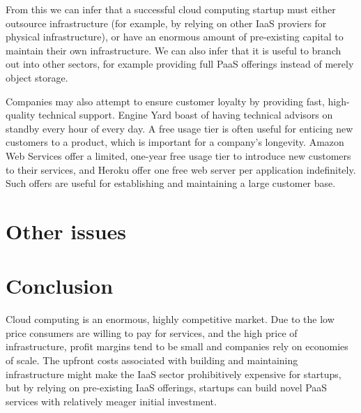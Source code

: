 \documentclass[a4paper]{proc}
\begin{document}
  From this we can infer that a successful cloud computing startup must either outsource infrastructure (for example, by relying on other IaaS proviers for physical infrastructure), or have an enormous amount of pre-existing capital to maintain their own infrastructure. We can also infer that it is useful to branch out into other sectors, for example providing full PaaS offerings instead of merely object storage.

  Companies may also attempt to ensure customer loyalty by providing fast, high-quality technical support. Engine Yard boast of having technical advisors on standby every hour of every day. A free usage tier is often useful for enticing new customers to a product, which is important for a company's longevity. Amazon Web Services offer a limited, one-year free usage tier to introduce new customers to their services, and Heroku offer one free web server per application indefinitely. Such offers are useful for establishing and maintaining a large customer base.

  \section{Other issues}
  \label{sec:other}


  \section{Conclusion}
  \label{sec:conclusion}

  Cloud computing is an enormous, highly competitive market. Due to the low price consumers are willing to pay for services, and the high price of infrastructure, profit margins tend to be small and companies rely on economies of scale. The upfront costs associated with building and maintaining infrastructure might make the IaaS sector prohibitively expensive for startups, but by relying on pre-existing IaaS offerings, startups can build novel PaaS services with relatively meager initial investment.

  \printbibliography
\end{document}
